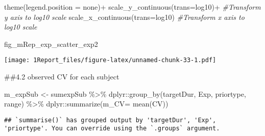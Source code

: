 \documentclass[
]{article}
\newenvironment{Shaded}{\begin{snugshade}}{\end{snugshade}}
\newcommand{\AttributeTok}[1]{\textcolor[rgb]{0.77,0.63,0.00}{#1}}
\newcommand{\CommentTok}[1]{\textcolor[rgb]{0.56,0.35,0.01}{\textit{#1}}}
\newcommand{\FunctionTok}[1]{\textcolor[rgb]{0.00,0.00,0.00}{#1}}
\newcommand{\NormalTok}[1]{#1}
\newcommand{\OtherTok}[1]{\textcolor[rgb]{0.56,0.35,0.01}{#1}}
\newcommand{\SpecialCharTok}[1]{\textcolor[rgb]{0.00,0.00,0.00}{#1}}
\newcommand{\StringTok}[1]{\textcolor[rgb]{0.31,0.60,0.02}{#1}}
\begin{document}
\begin{Shaded}
\begin{Highlighting}[]
  \FunctionTok{theme}\NormalTok{(}\AttributeTok{legend.position =} \StringTok{\textquotesingle{}none\textquotesingle{}}\NormalTok{)}\SpecialCharTok{+}
  \FunctionTok{scale\_y\_continuous}\NormalTok{(}\AttributeTok{trans=}\StringTok{\textquotesingle{}log10\textquotesingle{}}\NormalTok{)}\SpecialCharTok{+} \CommentTok{\#Transform y axis to log10 scale}
  \FunctionTok{scale\_x\_continuous}\NormalTok{(}\AttributeTok{trans=}\StringTok{\textquotesingle{}log10\textquotesingle{}}\NormalTok{) }\CommentTok{\#Transform x axis to log10 scale}

\NormalTok{fig\_mRep\_exp\_scatter\_exp2}
\end{Highlighting}
\end{Shaded}

\texttt{[image: 1Report\_files/figure-latex/unnamed-chunk-33-1.pdf]}

\#\#4.2 observed CV for each subject

\begin{Shaded}
\begin{Highlighting}[]
\NormalTok{m\_expSub }\OtherTok{\textless{}{-}}\NormalTok{ sumexpSub }\SpecialCharTok{\%\textgreater{}\%}\NormalTok{ dplyr}\SpecialCharTok{::}\FunctionTok{group\_by}\NormalTok{(targetDur, Exp, priortype, range) }\SpecialCharTok{\%\textgreater{}\%}
\NormalTok{    dplyr}\SpecialCharTok{::}\FunctionTok{summarize}\NormalTok{(}\AttributeTok{m\_CV=} \FunctionTok{mean}\NormalTok{(CV))}
\end{Highlighting}
\end{Shaded}

\begin{verbatim}
## `summarise()` has grouped output by 'targetDur', 'Exp', 'priortype'. You can override using the `.groups` argument.
\end{verbatim}
\end{document}
